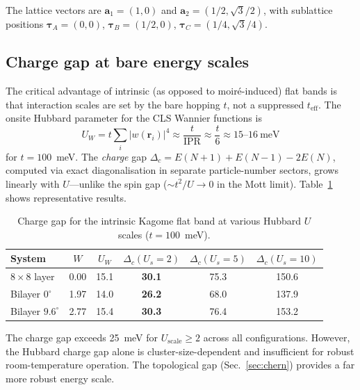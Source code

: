 \documentclass[aps,prb,twocolumn,superscriptaddress,floatfix]{revtex4-2}
\begin{document}
The lattice vectors are $\mathbf{a}_1 = (1, 0)$ and $\mathbf{a}_2 = (1/2, \sqrt{3}/2)$, with sublattice positions $\boldsymbol{\tau}_A = (0,0)$, $\boldsymbol{\tau}_B = (1/2, 0)$, $\boldsymbol{\tau}_C = (1/4, \sqrt{3}/4)$.

\subsection{Charge gap at bare energy scales}
\label{sec:charge_gap}

The critical advantage of intrinsic (as opposed to moir\'{e}-induced) flat bands is that interaction scales are set by the bare hopping $t$, not a suppressed $t_{\mathrm{eff}}$. The onsite Hubbard parameter for the CLS Wannier functions is
\begin{equation}
    U_W = t \sum_i |w(\mathbf{r}_i)|^4 \approx \frac{t}{\mathrm{IPR}} \approx \frac{t}{6} \approx 15\text{--}16~\mathrm{meV}
    \label{eq:UW}
\end{equation}
for $t = 100$~meV. The \emph{charge} gap $\Delta_c = E(N\!+\!1) + E(N\!-\!1) - 2E(N)$, computed via exact diagonalisation in separate particle-number sectors, grows linearly with $U$---unlike the spin gap ($\sim t^2/U \to 0$ in the Mott limit). Table~\ref{tab:charge_gap} shows representative results.

\begin{table}[b]
\caption{Charge gap for the intrinsic Kagome flat band at various Hubbard $U$ scales ($t = 100$~meV).}
\label{tab:charge_gap}
\begin{ruledtabular}
\begin{tabular}{lccccc}
System & $W$ & $U_W$ & $\Delta_c (U_s\!=\!2)$ & $\Delta_c (U_s\!=\!5)$ & $\Delta_c (U_s\!=\!10)$ \\
\hline
$8\!\times\!8$ layer & 0.00 & 15.1 & \textbf{30.1} & 75.3 & 150.6 \\
Bilayer $0^\circ$ & 1.97 & 14.0 & \textbf{26.2} & 68.0 & 137.9 \\
Bilayer $9.6^\circ$ & 2.77 & 15.4 & \textbf{30.3} & 76.4 & 153.2 \\
\end{tabular}
\end{ruledtabular}
\end{table}

The charge gap exceeds 25~meV for $U_{\mathrm{scale}} \ge 2$ across all configurations. However, the Hubbard charge gap alone is cluster-size-dependent and insufficient for robust room-temperature operation. The topological gap (Sec.~\ref{sec:chern}) provides a far more robust energy scale.
\end{document}
